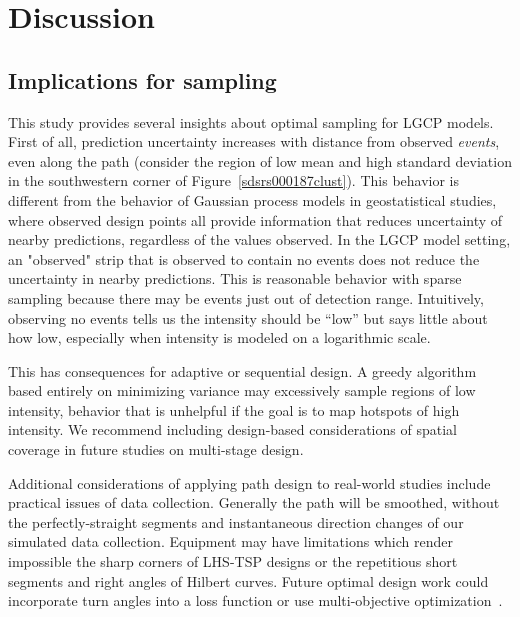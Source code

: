 \documentclass[review]{elsarticle}
\begin{document}


\section{Discussion}

\subsection{Implications for sampling}

This study provides several insights about optimal sampling for LGCP models.
First of all, prediction uncertainty increases with distance from observed
\emph{events}, even along the path (consider the region of low mean and high
standard deviation in the southwestern corner of
Figure~\ref{sdsrs000187clust}). This behavior is different from the behavior
of Gaussian process models in geostatistical studies, where observed design
points all provide information that reduces uncertainty of nearby predictions,
regardless of the values observed. In the LGCP model setting, an "observed"
strip that is observed to contain no events does not reduce the uncertainty in
nearby predictions. This is reasonable behavior with sparse sampling because
there may be events just out of detection range. Intuitively, observing no
events tells us the intensity should be ``low'' but says little about how low,
especially when intensity is modeled on a logarithmic scale.

This has consequences for adaptive or sequential design. A greedy algorithm
based entirely on minimizing variance may excessively sample regions of low
intensity, behavior that is unhelpful if the goal is to map hotspots of high
intensity. We recommend including design-based considerations of spatial
coverage in future studies on multi-stage design.

Additional considerations of applying path design to real-world studies include
practical issues of data collection. Generally the path will be smoothed,
without the perfectly-straight segments and instantaneous direction changes of
our simulated data collection. Equipment may have limitations which render
impossible the sharp corners of LHS-TSP designs or the repetitious short
segments and right angles of Hilbert curves. Future optimal design work could
incorporate turn angles into a loss function or use multi-objective
optimization~\citep{lark}.
\end{document}
